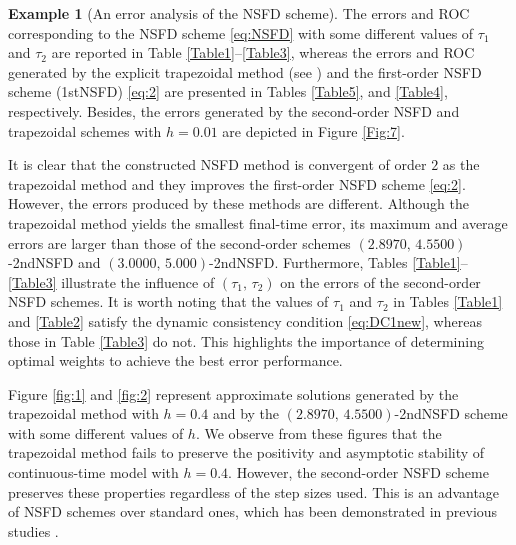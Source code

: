 \documentclass[12pt]{article}
\theoremstyle{definition}
\newtheorem{example}[theorem]{Example}
\theoremstyle{remark}
\numberwithin{equation}{section}
\begin{document}
\begin{example}[An error analysis of the NSFD scheme]
The errors and ROC corresponding to the NSFD scheme \eqref{eq:NSFD} with some different values of $\tau_1$ and $\tau_2$ are reported in Table \ref{Table1}--\ref{Table3}, whereas the errors and ROC generated by the explicit trapezoidal method (see \cite{Ascher}) and the first-order NSFD scheme (1stNSFD) \eqref{eq:2} are presented in Tables \ref{Table5}, and \ref{Table4}, respectively. Besides, the errors generated by the second-order NSFD and trapezoidal schemes with $h = 0.01$ are depicted in Figure \ref{Fig:7}.

It is clear that the constructed NSFD method is convergent of order $2$ as the trapezoidal method and they improves the first-order NSFD scheme \eqref{eq:2}. However, the errors produced by these methods are different. Although the trapezoidal method yields the smallest final-time error, its maximum and average errors are larger than those of the second-order schemes $(2.8970,\,4.5500)$-2ndNSFD and $(3.0000,\,5.000)$-2ndNSFD. Furthermore, Tables \ref{Table1}--\ref{Table3} illustrate the influence of $(\tau_1,\,\tau_2)$ on the errors of the second-order NSFD schemes. It is worth noting that the values of $\tau_1$ and $\tau_2$ in Tables \ref{Table1} and \ref{Table2} satisfy the dynamic consistency condition \eqref{eq:DC1new}, whereas those in Table \ref{Table3} do not. This highlights the importance of determining optimal weights to achieve the best error performance.



Figure \ref{fig:1} and \ref{fig:2} represent approximate solutions generated by the trapezoidal method with $h = 0.4$ and by the $(2.8970,\,4.5500)$-2ndNSFD scheme with some different values of $h$. We observe from these figures that the trapezoidal method fails to preserve the positivity and asymptotic stability of continuous-time model with $h = 0.4$. However, the second-order NSFD scheme preserves these properties regardless of the step sizes used. This is an advantage of NSFD schemes over standard ones, which has been demonstrated in previous studies \cite{Mickens1, Mickens2, Mickens3, Mickens4, Mickens5}.




\end{example}
\end{document}
